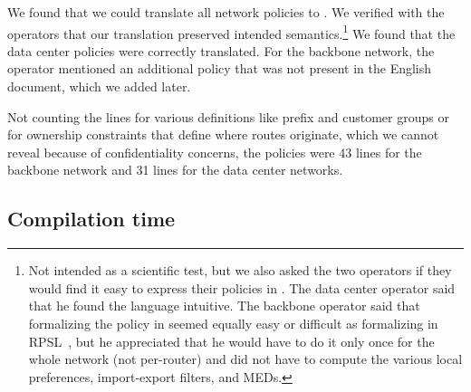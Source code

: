We found that we could translate all network policies to \sysname. We verified with the operators that our translation preserved intended semantics.\footnote{Not intended as a scientific test, but we also asked the two operators if they would find it easy to express their policies in \sysname. The data center operator said that he found the language intuitive. The backbone operator said that formalizing the policy in \sysname seemed equally easy or difficult as formalizing in RPSL~\cite{x}, but he appreciated that he would have to do it only once for the whole network (not per-router) and did not have to compute the various local preferences, import-export filters, and MEDs.} We found that the data center policies were correctly translated. For the backbone network, the operator mentioned an additional policy that was not present in the English document, which we added later.

Not counting the lines for various definitions like prefix and customer groups or for ownership constraints that define where routes originate, which we cannot reveal because of confidentiality concerns, the \sysname policies were 43 lines for the backbone network and 31 lines for the data center networks.

\subsection{Compilation time}


